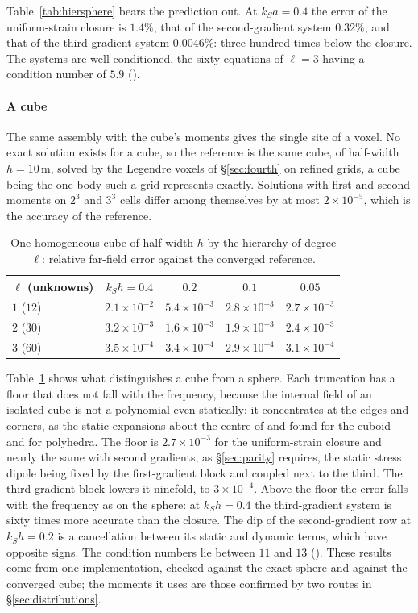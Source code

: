\documentclass[preprint,review,12pt]{elsarticle}
\begin{document}
Table~\ref{tab:hiersphere} bears the prediction out. At $k_Sa=0.4$ the error of the uniform-strain
closure is $1.4\%$, that of the second-gradient system $0.32\%$, and that of the third-gradient system
$0.0046\%$: three hundred times below the closure. The systems are well conditioned, the sixty
equations of $\ell=3$ having a condition number of $5.9$
().

\paragraph{A cube} The same assembly with the cube's moments gives the single site of a voxel. No
exact solution exists for a cube, so the reference is the same cube, of half-width $h=10$\,m, solved by
the Legendre voxels of \S\ref{sec:fourth} on refined grids, a cube being the one body such a grid
represents exactly. Solutions with first and second moments on $2^3$ and $3^3$ cells differ among
themselves by at most $2\times10^{-5}$, which is the accuracy of the reference.
\begin{table}[htbp]
\centering
\caption{One homogeneous cube of half-width $h$ by the hierarchy of degree $\ell$: relative far-field
error against the converged reference.}\label{tab:hiercube}
\small
\begin{tabular}{@{}lcccc@{}}
\toprule
$\ell$ (unknowns) & $k_Sh=0.4$ & $0.2$ & $0.1$ & $0.05$ \\
\midrule
$1$ ($12$) & $2.1\times10^{-2}$ & $5.4\times10^{-3}$ & $2.8\times10^{-3}$ & $2.7\times10^{-3}$ \\
$2$ ($30$) & $3.2\times10^{-3}$ & $1.6\times10^{-3}$ & $1.9\times10^{-3}$ & $2.4\times10^{-3}$ \\
$3$ ($60$) & $3.5\times10^{-4}$ & $3.4\times10^{-4}$ & $2.9\times10^{-4}$ & $3.1\times10^{-4}$ \\
\bottomrule
\end{tabular}
\end{table}
Table~\ref{tab:hiercube} shows what distinguishes a cube from a sphere. Each truncation has a floor that
does not fall with the frequency, because the internal field of an isolated cube is not a polynomial
even statically: it concentrates at the edges and corners, as the static expansions about the centre
of \citet{Johnson1980b} and \citet{WuZhangYin2021} found for the cuboid and for polyhedra. The floor is $2.7\times10^{-3}$ for the
uniform-strain closure and nearly the same with second gradients, as \S\ref{sec:parity} requires, the
static stress dipole being fixed by the first-gradient block and coupled next to the third. The
third-gradient block lowers it ninefold, to $3\times10^{-4}$. Above the floor the error falls with the
frequency as on the sphere: at $k_Sh=0.4$ the third-gradient system is sixty times more accurate than
the closure. The dip of the second-gradient row at $k_Sh=0.2$ is a cancellation between its static and
dynamic terms, which have opposite signs. The condition numbers lie between $11$ and $13$
(). These results come from one implementation,
checked against the exact sphere and against the converged cube; the moments it uses are those
confirmed by two routes in \S\ref{sec:distributions}.
\end{document}
